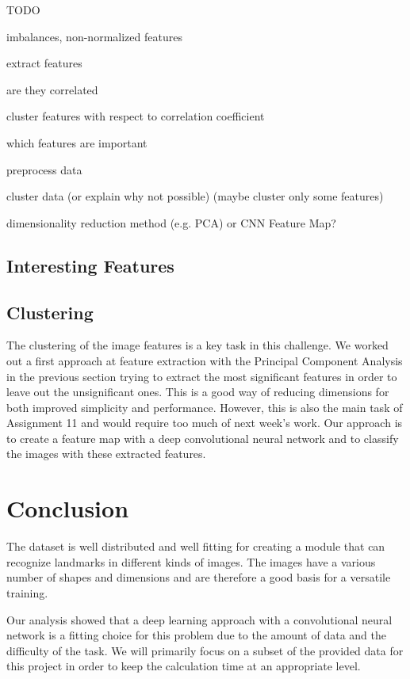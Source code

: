 TODO

imbalances, non-normalized features

extract features

are they correlated

cluster features with respect to correlation coefficient

which features are important

preprocess data

cluster data (or explain why not possible) (maybe cluster only some features)

dimensionality reduction method (e.g. PCA) or CNN Feature Map?

\section*{Interesting Features}

\section*{Clustering}

The clustering of the image features is a key task in this challenge. We worked out a first approach at feature extraction with the Principal Component Analysis in the previous section trying to extract the most significant features in order to leave out the unsignificant ones. This is a good way of reducing dimensions for both improved simplicity and performance. However, this is also the main task of Assignment 11 and would require too much of next week's work. Our approach is to create a feature map with a deep convolutional neural network and to classify the images with these extracted features.

\chapter{Conclusion}

The dataset is well distributed and well fitting for creating a module that can recognize landmarks in different kinds of images. The images have a various number of shapes and dimensions and are therefore a good basis for a versatile training.

Our analysis showed that a deep learning approach with a convolutional neural network is a fitting choice for this problem due to the amount of data and the difficulty of the task. We will primarily focus on a subset of the provided data for this project in order to keep the calculation time at an appropriate level.